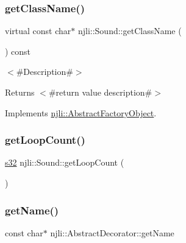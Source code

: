 \mbox{\label{classnjli_1_1_sound_ac88b2973a00fe0e9859022de01380be6}} 
\subsubsection{\texorpdfstring{get\+Class\+Name()}{getClassName()}}
{\footnotesize\ttfamily virtual const char$\ast$ njli\+::\+Sound\+::get\+Class\+Name (\begin{DoxyParamCaption}{ }\end{DoxyParamCaption}) const\hspace{0.3cm}{\ttfamily [virtual]}}

$<$\#\+Description\#$>$

\begin{DoxyReturn}{Returns}
$<$\#return value description\#$>$ 
\end{DoxyReturn}


Implements \mbox{\hyperlink{classnjli_1_1_abstract_factory_object_af4151e41b80d5bc3fc42822c67fc2278}{njli\+::\+Abstract\+Factory\+Object}}.

\mbox{\label{classnjli_1_1_sound_a200bee960269b65caf5e756db795cc31}} 
\subsubsection{\texorpdfstring{get\+Loop\+Count()}{getLoopCount()}}
{\footnotesize\ttfamily \mbox{\hyperlink{_util_8h_aa62c75d314a0d1f37f79c4b73b2292e2}{s32}} njli\+::\+Sound\+::get\+Loop\+Count (\begin{DoxyParamCaption}{ }\end{DoxyParamCaption})}

\mbox{\label{classnjli_1_1_sound_ad41266885be835f3ee602311e20877a4}} 
\subsubsection{\texorpdfstring{get\+Name()}{getName()}}
{\footnotesize\ttfamily const char$\ast$ njli\+::\+Abstract\+Decorator\+::get\+Name}

